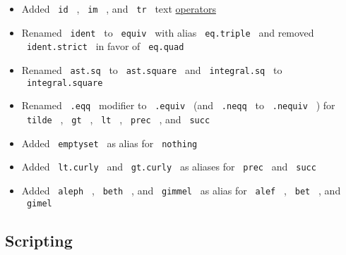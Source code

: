 \begin{itemize}
  \begin{itemize}
  \tightlist
  \item
    Added \texttt{\ id\ } , \texttt{\ im\ } , and \texttt{\ tr\ } text
    \href{/docs/reference/math/op/}{operators}
  \item
    Renamed \texttt{\ ident\ } to \texttt{\ equiv\ } with alias
    \texttt{\ eq.triple\ } and removed \texttt{\ ident.strict\ } in
    favor of \texttt{\ eq.quad\ }
  \item
    Renamed \texttt{\ ast.sq\ } to \texttt{\ ast.square\ } and
    \texttt{\ integral.sq\ } to \texttt{\ integral.square\ }
  \item
    Renamed \texttt{\ .eqq\ } modifier to \texttt{\ .equiv\ } (and
    \texttt{\ .neqq\ } to \texttt{\ .nequiv\ } ) for \texttt{\ tilde\ }
    , \texttt{\ gt\ } , \texttt{\ lt\ } , \texttt{\ prec\ } , and
    \texttt{\ succ\ }
  \item
    Added \texttt{\ emptyset\ } as alias for \texttt{\ nothing\ }
  \item
    Added \texttt{\ lt.curly\ } and \texttt{\ gt.curly\ } as aliases for
    \texttt{\ prec\ } and \texttt{\ succ\ }
  \item
    Added \texttt{\ aleph\ } , \texttt{\ beth\ } , and
    \texttt{\ gimmel\ } as alias for \texttt{\ alef\ } ,
    \texttt{\ bet\ } , and \texttt{\ gimel\ }
  \end{itemize}
\end{itemize}

\subsection{Scripting}\label{scripting}

